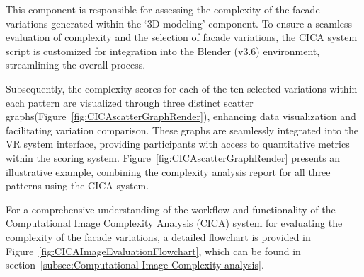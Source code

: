 %    

This component is responsible for assessing the complexity of the facade variations generated within the `3D modeling' component.
To ensure a seamless evaluation of complexity and the selection of facade variations, the CICA system script is customized for integration into the Blender (v3.6) environment, streamlining the overall process.

Subsequently, the complexity scores for each of the ten selected variations within each pattern are visualized through three distinct scatter graphs(Figure~\ref{fig:CICAscatterGraphRender}), enhancing data visualization and facilitating variation comparison.
These graphs are seamlessly integrated into the VR system interface, providing participants with access to quantitative metrics within the scoring system.
Figure~\ref{fig:CICAscatterGraphRender} presents an illustrative example, combining the complexity analysis report for all three patterns using the CICA system.

For a comprehensive understanding of the workflow and functionality of the Computational Image Complexity Analysis (CICA) system for evaluating the complexity of the facade variations, a detailed flowchart is provided in Figure~\ref{fig:CICAImageEvaluationFlowchart}, which can be found in section~\ref{subsec:Computational Image Complexity analysis}.

